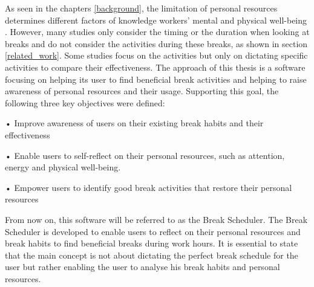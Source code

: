\documentclass{hasel_thesis}
\begin{document}

As seen in the chapters \ref{background}, the limitation of personal resources determines different factors of knowledge workers' mental and physical well-being \cite{Trougakos.2009}. However, many studies only consider the timing or the duration when looking at breaks and do not consider the activities during these breaks, as shown in section \ref{related_work}. Some studies focus on the activities but only on dictating specific activities to compare their effectiveness. The approach of this thesis is a software focusing on helping its user to find beneficial break activities and helping to raise awareness of personal resources and their usage. Supporting this goal, the following three key objectives were defined:

\begin{tcolorbox}[colback=white!5!white,colframe=black!75!black]
 •	Improve awareness of users on their existing break habits and their effectiveness

•	Enable users to self-reflect on their personal resources, such as attention, energy and physical well-being.

•	Empower users to identify good break activities that restore their personal resources
\end{tcolorbox}



From now on, this software will be referred to as the Break Scheduler. The Break Scheduler is developed to enable users to reflect on their personal resources and break habits to find beneficial breaks during work hours. It is essential to state that the main concept is not about dictating the perfect break schedule for the user but rather enabling the user to analyse his break habits and personal resources.
\end{document}
